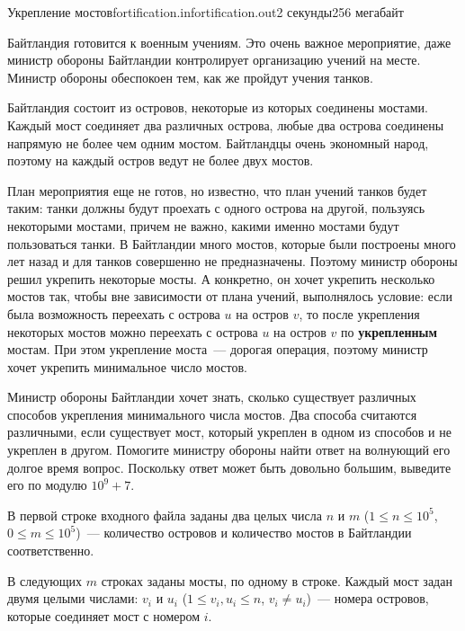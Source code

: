 \begin{problem}{Укрепление мостов}{fortification.in}{fortification.out}{2 секунды}{256 мегабайт}


Байтландия готовится к военным учениям. Это очень важное мероприятие, даже министр обороны 
Байтландии контролирует организацию учений на месте.
Министр обороны обеспокоен тем, как же пройдут учения танков. 

Байтландия состоит из островов, некоторые из которых соединены мостами. 
Каждый мост соединяет два различных острова, любые два острова соединены напрямую 
не более чем одним мостом. Байтландцы очень экономный народ, поэтому на 
каждый остров ведут не более двух мостов.

План мероприятия еще не готов, но известно, что план учений танков будет таким: танки должны будут проехать с
одного острова на другой, пользуясь некоторыми мостами, причем не важно, какими именно мостами будут пользоваться танки.
В Байтландии много мостов, которые были построены много лет назад и для танков совершенно не предназначены.
Поэтому министр обороны решил укрепить некоторые мосты. 
А конкретно, он хочет укрепить несколько мостов так, чтобы вне зависимости от плана учений, выполнялось условие:
если была возможность переехать с острова $u$ на остров $v$, то после укрепления некоторых мостов 
можно переехать с острова $u$ на остров $v$ по \textbf{укрепленным} мостам.
При этом укрепление моста~--- дорогая операция, поэтому министр хочет укрепить минимальное
число мостов.

Министр обороны Байтландии хочет знать, сколько существует различных способов 
укрепления минимального числа мостов. 
Два способа считаются различными, если существует мост, который укреплен в одном из способов и не 
укреплен в другом.
Помогите министру обороны найти ответ на волнующий его долгое время вопрос.
Поскольку ответ может быть довольно большим, выведите его по модулю $10^9+7$.

\InputFile

В первой строке входного файла заданы два целых числа $n$ и $m$	($1 \le n \le 10^5$, $0 \le m \le 10^5$)~--- 
количество островов и количество мостов в Байтландии соответственно.
                                                                                       
В следующих $m$ строках заданы мосты, по одному в строке. Каждый мост задан двумя 
целыми числами: $v_i$ и $u_i$ ($1 \le v_i, u_i \le n$, $v_i \neq u_i$)~--- 
номера островов, которые соединяет мост с номером $i$.


\end{problem}
